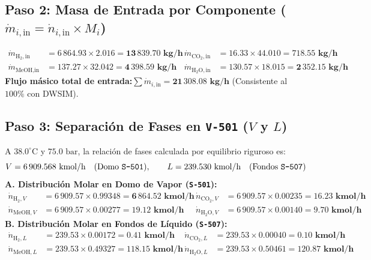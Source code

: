\documentclass[11pt,letterpaper]{article}
\begin{document}
\subsection{\texorpdfstring{Paso 2: Masa de Entrada por Componente ($\dot{m}_{i,\text{in}} = \dot{n}_{i,\text{in}} \times M_i$)}{Paso 2: Masa de Entrada por Componente}}
\begin{align*}
    \dot{m}_{\text{H}_2,\text{in}} &= 6\,864.93 \times 2.016 = \mathbf{13\,839.70\text{ kg/h}} &
    \dot{m}_{\text{CO}_2,\text{in}} &= 16.33 \times 44.010 = \mathbf{718.55\text{ kg/h}} \\
    \dot{m}_{\text{MeOH},\text{in}} &= 137.27 \times 32.042 = \mathbf{4\,398.59\text{ kg/h}} &
    \dot{m}_{\text{H}_2\text{O},\text{in}} &= 130.57 \times 18.015 = \mathbf{2\,352.15\text{ kg/h}}
\end{align*}
\textbf{Flujo másico total de entrada:}\quad $\sum \dot{m}_{i,\text{in}} = \mathbf{21\,308.08\text{ kg/h}}$ (Consistente al $100\%$ con DWSIM).

\subsection{\texorpdfstring{Paso 3: Separación de Fases en \texttt{V-501} ($V$ y $L$)}{Paso 3: Separación de Fases en V-501}}
A $38.0^\circ\text{C}$ y $75.0\text{ bar}$, la relación de fases calculada por equilibrio riguroso es:
\begin{equation*}
    V = 6\,909.568\text{ kmol/h} \quad (\text{Domo \texttt{S-501}}), \qquad L = 239.530\text{ kmol/h} \quad (\text{Fondos \texttt{S-507}})
\end{equation*}
\textbf{A. Distribución Molar en Domo de Vapor (\texttt{S-501}):}
\begin{align*}
    \dot{n}_{\text{H}_2,V} &= 6\,909.57 \times 0.99348 = \mathbf{6\,864.52\text{ kmol/h}} &
    \dot{n}_{\text{CO}_2,V} &= 6\,909.57 \times 0.00235 = \mathbf{16.23\text{ kmol/h}} \\
    \dot{n}_{\text{MeOH},V} &= 6\,909.57 \times 0.00277 = \mathbf{19.12\text{ kmol/h}} &
    \dot{n}_{\text{H}_2\text{O},V} &= 6\,909.57 \times 0.00140 = \mathbf{9.70\text{ kmol/h}}
\end{align*}
\textbf{B. Distribución Molar en Fondos de Líquido (\texttt{S-507}):}
\begin{align*}
    \dot{n}_{\text{H}_2,L} &= 239.53 \times 0.00172 = \mathbf{0.41\text{ kmol/h}} &
    \dot{n}_{\text{CO}_2,L} &= 239.53 \times 0.00040 = \mathbf{0.10\text{ kmol/h}} \\
    \dot{n}_{\text{MeOH},L} &= 239.53 \times 0.49327 = \mathbf{118.15\text{ kmol/h}} &
    \dot{n}_{\text{H}_2\text{O},L} &= 239.53 \times 0.50461 = \mathbf{120.87\text{ kmol/h}}
\end{align*}
\end{document}
